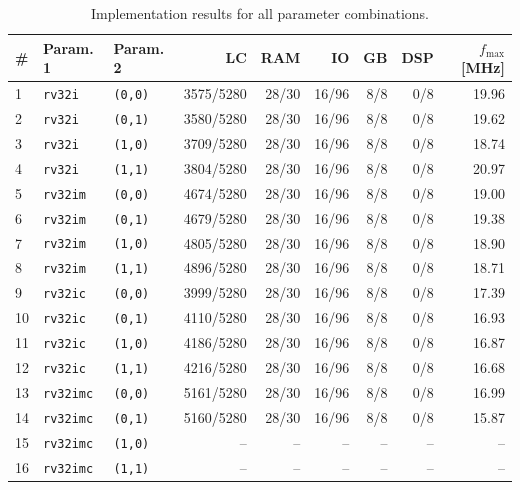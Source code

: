 \documentclass[a4paper,11pt]{article}
\begin{document}
\small
\begin{table}[!ht]
	\centering
	\caption{Implementation results for all parameter combinations.}
	\begin{tabular*}{\textwidth}{@{\extracolsep{\fill}} l l l r r r r r r}
		\toprule
		\# & Param. 1         & Param. 2       & LC        & RAM   & IO    & GB  & DSP & $f_{\max}$ [MHz] \\
		\midrule
		1  & \texttt{rv32i}   & \texttt{(0,0)} & 3575/5280 & 28/30 & 16/96 & 8/8 & 0/8 & 19.96 \\
		2  & \texttt{rv32i}   & \texttt{(0,1)} & 3580/5280 & 28/30 & 16/96 & 8/8 & 0/8 & 19.62 \\
		3  & \texttt{rv32i}   & \texttt{(1,0)} & 3709/5280 & 28/30 & 16/96 & 8/8 & 0/8 & 18.74 \\
		4  & \texttt{rv32i}   & \texttt{(1,1)} & 3804/5280 & 28/30 & 16/96 & 8/8 & 0/8 & 20.97 \\
		5  & \texttt{rv32im}  & \texttt{(0,0)} & 4674/5280 & 28/30 & 16/96 & 8/8 & 0/8 & 19.00 \\
		6  & \texttt{rv32im}  & \texttt{(0,1)} & 4679/5280 & 28/30 & 16/96 & 8/8 & 0/8 & 19.38 \\
		7  & \texttt{rv32im}  & \texttt{(1,0)} & 4805/5280 & 28/30 & 16/96 & 8/8 & 0/8 & 18.90 \\
		8  & \texttt{rv32im}  & \texttt{(1,1)} & 4896/5280 & 28/30 & 16/96 & 8/8 & 0/8 & 18.71 \\
		9  & \texttt{rv32ic}  & \texttt{(0,0)} & 3999/5280 & 28/30 & 16/96 & 8/8 & 0/8 & 17.39 \\
		10 & \texttt{rv32ic}  & \texttt{(0,1)} & 4110/5280 & 28/30 & 16/96 & 8/8 & 0/8 & 16.93 \\
		11 & \texttt{rv32ic}  & \texttt{(1,0)} & 4186/5280 & 28/30 & 16/96 & 8/8 & 0/8 & 16.87 \\
		12 & \texttt{rv32ic}  & \texttt{(1,1)} & 4216/5280 & 28/30 & 16/96 & 8/8 & 0/8 & 16.68 \\
		13 & \texttt{rv32imc} & \texttt{(0,0)} & 5161/5280 & 28/30 & 16/96 & 8/8 & 0/8 & 16.99 \\
		14 & \texttt{rv32imc} & \texttt{(0,1)} & 5160/5280 & 28/30 & 16/96 & 8/8 & 0/8 & 15.87 \\
		15 & \texttt{rv32imc} & \texttt{(1,0)} & --        & --    & --    & --  & --  & --    \\
		16 & \texttt{rv32imc} & \texttt{(1,1)} & --        & --    & --    & --  & --  & --    \\
		\bottomrule
	\end{tabular*}
\end{table}
\end{document}
